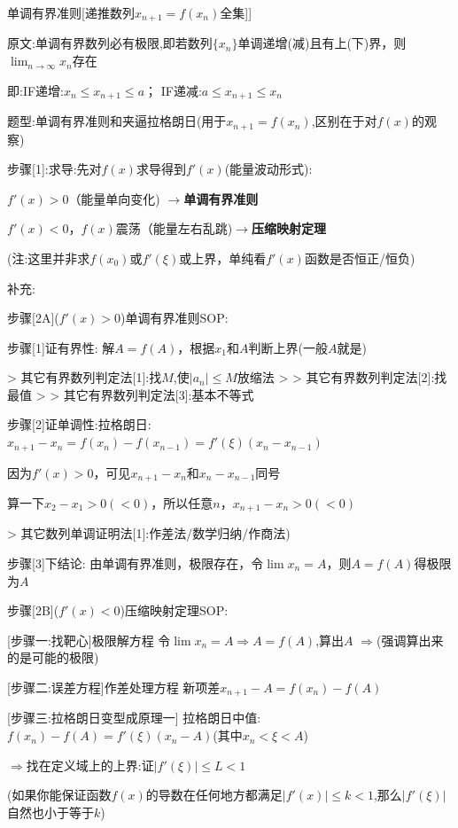 \documentclass[11pt,a4paper,UTF8]{ctexart}
\begin{document}
\begin{thmbox}[[5]单调有界准则[递推数列$x_{n+1} = f(x_n)$全集]]

原文:单调有界数列必有极限,即若数列$\{x_n\}$单调递增(减)且有上(下)界，则$\lim_{n \to \infty} x_n$存在

  即:IF递增:$x_n \le x_{n+1} \le a$； IF递减:$a \le x_{n+1} \le x_n$

题型:单调有界准则和夹逼拉格朗日(用于$x_{n+1} = f(x_n)$,区别在于对$f(x)$的观察)

\textit{}步骤[1]:求导:先对$f(x)$求导得到$f'(x)$(能量波动形式):\textit{} 

  $f'(x)>0$（能量单向变化)	$\to$\textbf{单调有界准则}

  $f'(x)<0$，$f(x)$震荡（能量左右乱跳)$\to$\textbf{压缩映射定理} 

  (注:这里并非求$f(x_0)$或$f'(\xi)$或上界，单纯看$f'(x)$函数是否恒正/恒负)

  补充:

  

\textit{}步骤[2A]($f'(x)>0$)单调有界准则SOP:\textit{}

  步骤[1]证有界性: 解$A=f(A)$，根据$x_1$和$A$判断上界(一般$A$就是)

  >   其它有界数列判定法[1]:找$M$,使$|a_n| \le M$放缩法 
  >
  >   其它有界数列判定法[2]:找最值
  >
  >   其它有界数列判定法[3]:基本不等式

  步骤[2]证单调性:拉格朗日:$x_{n+1} - x_n = f(x_n) - f(x_{n-1}) = f'(\xi)(x_n - x_{n-1})$

  	       因为$f'(x)>0$，可见$x_{n+1}-x_n$和$x_n-x_{n-1}$同号

  		算一下$x_2-x_1 > 0 (<0)$，所以任意$n$，$x_{n+1}-x_n > 0 (<0)$

  >   其它数列单调证明法[1]:作差法/数学归纳/作商法)

  步骤[3]下结论: 由单调有界准则，极限存在，令$\lim x_n = A$，则$A=f(A)$得极限为$A$

\textit{}步骤[2B]($f'(x)<0$)压缩映射定理SOP:\textit{}

[步骤一:找靶心]极限解方程  	令$\lim x_n = A \Rightarrow A = f(A)$,算出$A$ $\Rightarrow$(强调算出来的是可能的极限)

[步骤二:误差方程]作差处理方程      新项差$x_{n+1} - A = f(x_n) - f(A)$

[步骤三:拉格朗日变型成原理一]      拉格朗日中值:$f(x_n) - f(A) = f'(\xi)(x_n - A)$(其中$x_n < \xi < A$)

			$\Rightarrow$找在定义域上的上界:证$|f'(\xi)| \le L < 1$

			(如果你能保证函数$f(x)$的导数在任何地方都满足$\vert{}f'(x)\vert{} \le k < 1$,那么$\vert{}f'(\xi)\vert{}$自然也小于等于$k$)


\end{thmbox}
\end{document}
